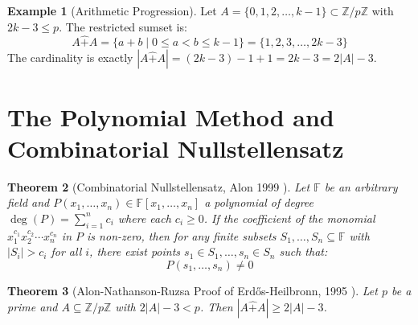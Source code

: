 \documentclass[11pt,a4paper]{article}
\newtheorem{theorem}{Theorem}[section]
\theoremstyle{definition}
\newtheorem{example}[theorem]{Example}
\begin{document}
\begin{example}[Arithmetic Progression]\label{ex:ap_sharp}
Let $A = \{0, 1, 2, \dots, k - 1\} \subset \mathbb{Z}/p\mathbb{Z}$ with $2k - 3 \le p$.
The restricted sumset is:
\[ A \hat{+} A = \{ a + b \mid 0 \le a < b \le k - 1 \} = \{ 1, 2, 3, \dots, 2k - 3 \} \]
The cardinality is exactly $|A \hat{+} A| = (2k - 3) - 1 + 1 = 2k - 3 = 2|A| - 3$.
\end{example}

\section{The Polynomial Method and Combinatorial Nullstellensatz}

\begin{theorem}[Combinatorial Nullstellensatz, Alon 1999 \cite{alon1999null}]\label{thm:nullstellensatz}
Let $\mathbb{F}$ be an arbitrary field and $P(x_1, \dots, x_n) \in \mathbb{F}[x_1, \dots, x_n]$ a polynomial of degree $\deg(P) = \sum_{i=1}^n c_i$ where each $c_i \ge 0$.
If the coefficient of the monomial $x_1^{c_1} x_2^{c_2} \cdots x_n^{c_n}$ in $P$ is non-zero, then for any finite subsets $S_1, \dots, S_n \subseteq \mathbb{F}$ with $|S_i| > c_i$ for all $i$, there exist points $s_1 \in S_1, \dots, s_n \in S_n$ such that:
\begin{equation}\label{eq:null_non_zero}
P(s_1, \dots, s_n) \ne 0
\end{equation}
\end{theorem}

\begin{theorem}[Alon-Nathanson-Ruzsa Proof of Erd\H{o}s-Heilbronn, 1995 \cite{alon1995eh}]\label{thm:anr}
Let $p$ be a prime and $A \subseteq \mathbb{Z}/p\mathbb{Z}$ with $2|A| - 3 < p$.
Then $|A \hat{+} A| \ge 2|A| - 3$.
\end{theorem}
\end{document}
